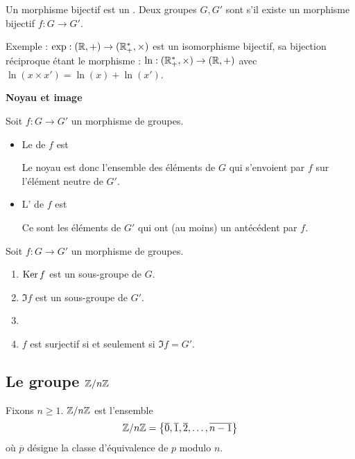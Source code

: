 \documentclass[10pt,class=article,crop=false]{standalone}
\begin{document}
\begin{multicols}{2}
Un morphisme bijectif est un . Deux groupes $G, G'$ sont  s'il existe un morphisme bijectif $f : G \longrightarrow G'$.

Exemple : $\exp : (\mathbb{R},+) \to (\mathbb{R}_+^*,\times)$ est un isomorphisme bijectif, sa bijection réciproque étant le morphisme : $\ln : (\mathbb{R}_+^*,\times) \to (\mathbb{R},+)$ avec $\ln(x \times x') = \ln(x) + \ln(x')$.


\textbf{Noyau et image}

Soit $f: G \longrightarrow G'$ un morphisme de groupes.

\begin{itemize}
	\item Le  de $f$ est
	
Le noyau est donc l'ensemble des éléments de $G$ qui s'envoient
par $f$ sur l'élément neutre de $G'$.

    \item L' de $f$ est
	
	Ce sont les éléments de $G'$ qui ont (au moins) un antécédent par $f$.
\end{itemize}	
	
\begin{proposition}
	Soit $f: G \longrightarrow G'$ un morphisme de groupes.
	\begin{enumerate}
		\item $\operatorname{Ker} f$ est un sous-groupe de $G$.
		\item $\Im f$ est un sous-groupe de $G'$.
		\item {}
		\item $f$ est surjectif si et seulement si $\Im f = G'$.
	\end{enumerate}
\end{proposition}




\subsection{Le groupe $\mathbb{Z}/n\mathbb{Z}$}


Fixons $n \ge 1$. $\mathbb{Z}/n\mathbb{Z}$
est l'ensemble
$$\mathbb{Z}/n\mathbb{Z} =\left\{ \overline{0}, \overline{1}, \overline{2},\ldots, \overline{n-1} \right\}$$
où $\overline p$ désigne la classe d'équivalence de $p$ modulo $n$.


\end{multicols}
\end{document}
